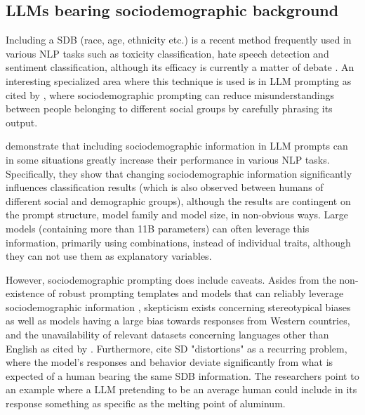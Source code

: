 \subsection{LLMs bearing sociodemographic background}
\label{sec:related:sociodemographic}

Including a \ac{SDB} (race, age, ethnicity etc.) is a recent method frequently used in various \ac{NLP} tasks such as toxicity classification, hate speech detection and sentiment classification, although its efficacy is currently a matter of debate \cite{beck-etal-2024-sensitivity}. An interesting specialized area where this technique is used is in LLM prompting \cite{hwang-etal-2023-aligning, durmus2024measuringrepresentationsubjectiveglobal} as cited by \cite{beck-etal-2024-sensitivity}, where sociodemographic prompting can reduce misunderstandings between people belonging to different social groups by carefully phrasing its output. 

\cite{beck-etal-2024-sensitivity} demonstrate that including sociodemographic information in LLM prompts can in some situations greatly increase their performance in various NLP tasks. Specifically, they show that changing sociodemographic information significantly influences classification results (which is also observed between humans of different social and demographic groups), although the results are contingent on the prompt structure, model family and model size, in non-obvious ways. Large models (containing more than 11B parameters) can often leverage this information, primarily using combinations, instead of individual traits, although they can not use them as explanatory variables.

However, sociodemographic prompting does include caveats. Asides from the non-existence of robust prompting templates and models that can reliably leverage sociodemographic information \cite{beck-etal-2024-sensitivity}, skepticism exists concerning stereotypical biases \cite{cheng-etal-2023-marked, deshpande-etal-2023-toxicity} as well as models having a large bias towards responses from Western countries, and the unavailability of relevant datasets concerning languages other than English \cite{pmlr-v202-santurkar23a, durmus2024measuringrepresentationsubjectiveglobal, santy-etal-2023-nlpositionality} as cited by \cite{beck-etal-2024-sensitivity}. Furthermore, \cite{aher2023usinglargelanguagemodels} cite SD "distortions" as a recurring problem, where the model's responses and behavior deviate significantly from what is expected of a human bearing the same \ac{SDB} information. The researchers point to an example where a LLM pretending to be an average human could include in its response something as specific as the melting point of aluminum.


